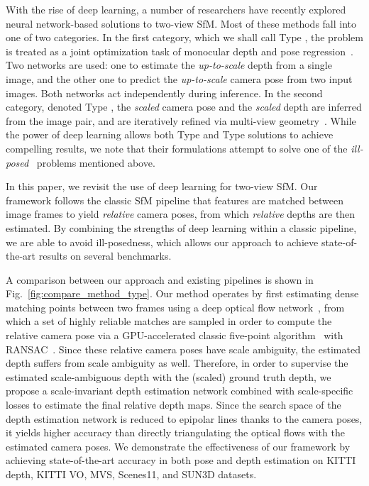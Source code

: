 \documentclass[final]{cvpr}
\begin{document}
With the rise of deep learning, a number of researchers have recently explored neural network-based solutions to two-view SfM.
Most of these methods fall into one of two categories.
In the first category, which we shall call Type , the problem is treated as a joint optimization task of monocular depth and pose regression~\cite{sfmlearner,yin2018geonet,Ranjan_2019_CVPR}.
Two networks are used:  one to estimate the \emph{up-to-scale} depth from a single image, and the other one to predict the \emph{up-to-scale} camera pose from two input images. Both networks act independently during inference.
In the second category, denoted Type , the \emph{scaled} camera pose and the \emph{scaled} depth are inferred from the image pair, and are iteratively refined via multi-view geometry~\cite{ummenhofer2017demon,tang2018ba,teed2018deepv2d}. 
While the power of deep learning allows both Type  and Type  solutions to achieve compelling results,
we note that their formulations attempt to solve one of the \emph{ill-posed}~\cite{bertero1988illposed} problems mentioned above.



In this paper, we revisit the use of deep learning for two-view SfM.
Our framework follows the classic SfM pipeline that features are matched between image frames to yield \emph{relative} camera poses, from which \emph{relative} depths are then estimated. 
By combining the strengths of deep learning within a classic pipeline, we are able to avoid ill-posedness, which allows our approach to achieve state-of-the-art results on several benchmarks.

A comparison between our approach and existing pipelines is shown in Fig.~\ref{fig:compare_method_type}.
Our method operates by first estimating dense matching points between two frames using a deep optical flow network~\cite{zhong2019unsupervised,zhong2020nipsflow}, from which a set of highly reliable matches are sampled in order to compute the relative camera pose via a GPU-accelerated classic five-point algorithm~\cite{li2006five} with RANSAC~\cite{fischler1981random}. Since these relative camera poses have scale ambiguity, the estimated depth suffers from scale ambiguity as well. Therefore, in order to supervise the estimated scale-ambiguous depth with the (scaled) ground truth depth, we propose a scale-invariant depth estimation network combined with scale-specific losses to estimate the final relative depth maps. Since the search space of the depth estimation network is reduced to epipolar lines thanks to the camera poses, it yields higher accuracy than directly triangulating the optical flows with the estimated camera poses. 
We demonstrate the effectiveness of our framework by achieving state-of-the-art accuracy in both pose and depth estimation on KITTI depth, KITTI VO, MVS, Scenes11, and SUN3D datasets. 
\end{document}
